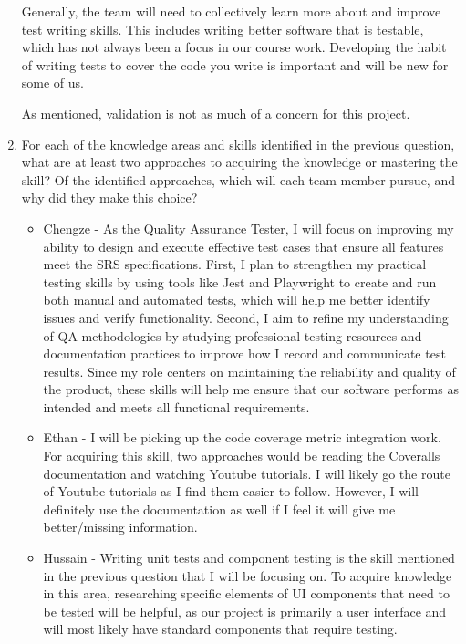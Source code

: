 \documentclass[12pt, titlepage]{article}
\begin{document}
\begin{enumerate}
    Generally, the team will need to collectively learn more about and improve
    test writing skills. This includes writing better software that is
    testable, which has not always been a focus in our course work. Developing
    the habit of writing tests to cover the code you write is important and
    will be new for some of us.

    As mentioned, validation is not as much of a concern for this project.

  \item For each of the knowledge areas and skills identified in the previous
  question, what are at least two approaches to acquiring the knowledge or
  mastering the skill?  Of the identified approaches, which will each team
  member pursue, and why did they make this choice?
  \begin{itemize}
    \item Chengze - As the Quality Assurance Tester, I will focus on improving my 
    ability to design and execute effective test cases that ensure all features 
    meet the SRS specifications. First, I plan to strengthen my practical testing 
    skills by using tools like Jest and Playwright to create and run both manual 
    and automated tests, which will help me better identify issues and verify functionality. 
    Second, I aim to refine my understanding of QA methodologies by studying professional 
    testing resources and documentation practices to improve how I record and communicate 
    test results. Since my role centers on maintaining the reliability and quality of the 
    product, these skills will help me ensure that our software performs as intended and 
    meets all functional requirements.
    \item Ethan - I will be picking up the code coverage metric integration
      work. For acquiring this skill, two approaches would be reading the
      Coveralls documentation and watching Youtube tutorials. I will likely go
      the route of Youtube tutorials as I find them easier to follow. However,
      I will definitely use the documentation as well if I feel it will give me
      better/missing information.
    \item Hussain - Writing unit tests and component testing is the skill
    mentioned in the previous question that I will be focusing on. To acquire
    knowledge in this area, researching specific elements of UI components that
    need to be tested will be helpful, as our project is primarily a user
    interface and will most likely have standard components that require testing.

\end{itemize}
\end{enumerate}
\end{document}
